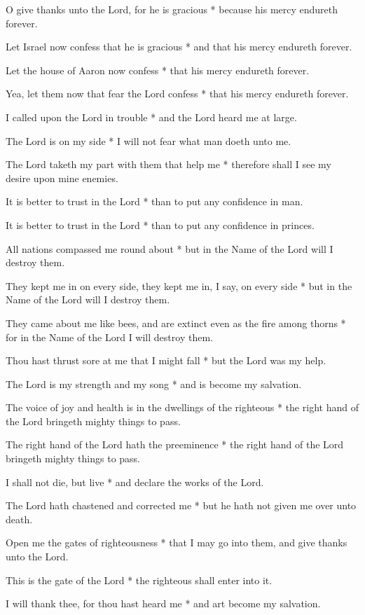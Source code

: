 O give thanks unto the Lord, for he is gracious * because his mercy endureth forever.

Let Israel now confess that he is gracious * and that his mercy endureth forever.

Let the house of Aaron now confess * that his mercy endureth forever.

Yea, let them now that fear the Lord confess * that his mercy endureth forever.

I called upon the Lord in trouble * and the Lord heard me at large.

The Lord is on my side * I will not fear what man doeth unto me.

The Lord taketh my part with them that help me * therefore shall I see my desire upon mine enemies.

It is better to trust in the Lord * than to put any confidence in man.

It is better to trust in the Lord * than to put any confidence in princes.

All nations compassed me round about * but in the Name of the Lord will I destroy them.

They kept me in on every side, they kept me in, I say, on every side * but in the Name of the Lord will I destroy them.

They came about me like bees, and are extinct even as the fire among thorns * for in the Name of the Lord I will destroy them.

Thou hast thrust sore at me that I might fall * but the Lord was my help.

The Lord is my strength and my song * and is become my salvation.

The voice of joy and health is in the dwellings of the righteous * the right hand of the Lord bringeth mighty things to pass.

The right hand of the Lord hath the preeminence * the right hand of the Lord bringeth mighty things to pass.

I shall not die, but live * and declare the works of the Lord.

The Lord hath chastened and corrected me * but he hath not given me over unto death.

Open me the gates of righteousness * that I may go into them, and give thanks unto the Lord.

This is the gate of the Lord * the righteous shall enter into it.

I will thank thee, for thou hast heard me * and art become my salvation.

